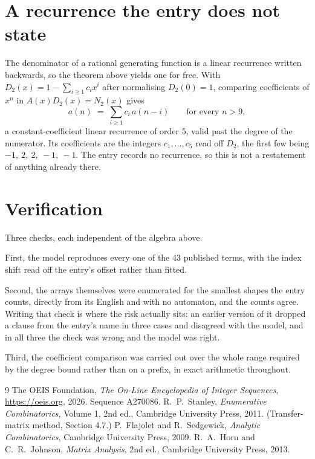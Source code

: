 \documentclass[11pt,a4paper]{article}
\theoremstyle{plain}
\theoremstyle{definition}
\begin{document}
\section{A recurrence the entry does not state}

The denominator of a rational generating function is a linear recurrence written backwards, so
the theorem above yields one for free. With $D_2(x)=1-\sum_{i\ge1}c_ix^i$ after normalising
$D_2(0)=1$, comparing coefficients of $x^n$ in $A(x)D_2(x)=N_2(x)$ gives
\[
a(n)\;=\;\sum_{i\ge1}c_i\,a(n-i)\qquad\text{for every }n>9,
\]
a constant-coefficient linear recurrence of order $5$, valid past the degree of the
numerator. Its coefficients are the integers $c_1,\dots,c_{5}$ read off $D_2$, the first few being $-1,\ 2,\ 2,\ -1,\ -1$. The entry records no recurrence, so this is not a restatement of anything
already there.

\section{Verification}

Three checks, each independent of the algebra above.

First, the model reproduces every one of the $43$ published terms, with the index shift
read off the entry's offset rather than fitted.

Second, the arrays themselves were enumerated for the smallest shapes the entry counts,
directly from its English and with no automaton, and the counts agree. Writing that check is
where the risk actually sits: an earlier version of it dropped a clause from the entry's name
in three cases and disagreed with the model, and in all three the check was wrong and the model
was right.

Third, the coefficient comparison was carried out over the whole range required by the degree
bound rather than on a prefix, in exact arithmetic throughout.

\begin{thebibliography}{9}
 The OEIS Foundation, \emph{The On-Line Encyclopedia of Integer
Sequences}, \url{https://oeis.org}, 2026. Sequence A270086.
 R.~P.~Stanley, \emph{Enumerative Combinatorics}, Volume 1, 2nd ed.,
Cambridge University Press, 2011. (Transfer-matrix method, Section 4.7.)
 P.~Flajolet and R.~Sedgewick, \emph{Analytic Combinatorics}, Cambridge
University Press, 2009.
 R.~A.~Horn and C.~R.~Johnson, \emph{Matrix Analysis}, 2nd ed., Cambridge
University Press, 2013.
\end{thebibliography}
\end{document}
